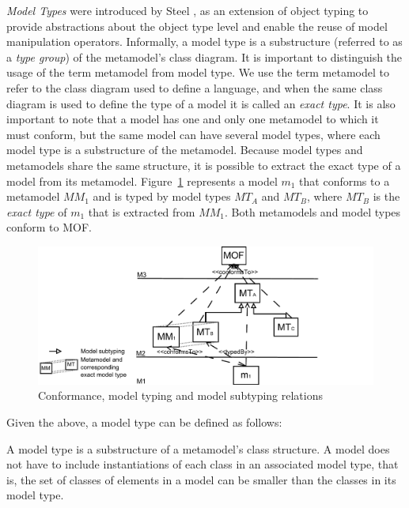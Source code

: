 {\em Model Types} were introduced by Steel \etal \cite{Steel07}, as an extension of object typing to provide abstractions about the object type level and enable the reuse of model manipulation operators.  Informally, a model type is a substructure (referred to as a {\em type group}) of the metamodel's class diagram.  It is important to distinguish the usage of the term metamodel from model type. We use the term metamodel to refer to the class diagram used to define a language, and when the same class diagram is used to define the type of a model it is called an {\em exact type}. It is also important to note that a model has one and only one metamodel to which it must conform, but the same model can have several model types, where each model type is a substructure of the metamodel. Because model types and metamodels share the same structure, it is possible to extract the exact type of a model from its metamodel. Figure~\ref{3lvl} represents a model $m_1$ that conforms to a metamodel $MM_1$ and is typed by model types $MT_A$ and $MT_B$, where $MT_B$ is the \emph{exact type} of $m_1$ that is extracted from $MM_1$. Both metamodels and model types conform to MOF.
\begin{figure}[tb]
	\center
	\includegraphics[scale=0.37]{fig/3levels2.pdf}
	\caption{Conformance, model typing and model subtyping relations}
	\label{3lvl}
\end{figure}
Given the above, a model type can be defined as follows:
\begin{definition}\label{modeltypedef}
A model type is a substructure of a metamodel's class structure. A model does not have to include instantiations of each class in an associated model type, that is, the set of classes of elements in a model can be smaller than the classes in its model type.
\end{definition}

